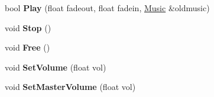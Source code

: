 \begin{DoxyCompactItemize}
\item 
bool {\bfseries Play} (float fadeout, float fadein, \hyperlink{classMusic}{Music} \&oldmusic)\hypertarget{classMusic_ad71c16ad204e1951a0d7ef8a5db0044f}{}\label{classMusic_ad71c16ad204e1951a0d7ef8a5db0044f}

\item 
void {\bfseries Stop} ()\hypertarget{classMusic_aba50daa8b632b6019506a3481a0fc760}{}\label{classMusic_aba50daa8b632b6019506a3481a0fc760}

\item 
void {\bfseries Free} ()\hypertarget{classMusic_a11e0a0d4323d89642e84f2c1ff258e49}{}\label{classMusic_a11e0a0d4323d89642e84f2c1ff258e49}

\item 
void {\bfseries Set\+Volume} (float vol)\hypertarget{classMusic_ae7db2c52870c9d5829354c12c1f81349}{}\label{classMusic_ae7db2c52870c9d5829354c12c1f81349}

\item 
void {\bfseries Set\+Master\+Volume} (float vol)\hypertarget{classMusic_a0cf162bc159a12f49995316f2b7b7c60}{}\label{classMusic_a0cf162bc159a12f49995316f2b7b7c60}

\end{DoxyCompactItemize}
